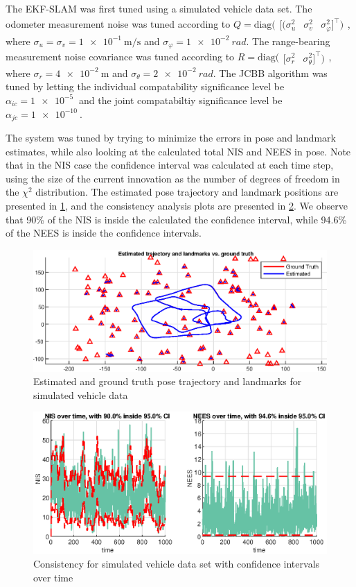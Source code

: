 The EKF-SLAM was first tuned using a simulated vehicle data set. The odometer measurement noise was tuned according to $Q = \text{diag}(\begin{array}{ccc}[(\sigma_u^2 & \sigma_v^2 & \sigma_\varphi^2 ]^{\top})\end{array}$, where $\sigma_u = \sigma_v = \SI{1e-1}{\meter\per\second}$ and $\sigma_\varphi = \SI{1e-2}{rad}$. The range-bearing measurement noise covariance was tuned according to $R = \text{diag}(\begin{array}{cc}[\sigma_r^2 & \sigma_\theta^2 ]^{\top})\end{array}$, where $\sigma_r = \SI{4e-2}{\meter}$ and $\sigma_\theta = \SI{2e-2}{rad}$. The JCBB algorithm was tuned by letting the individual compatability significance level be $\alpha_{ic} = \SI{1e-5}{}$ and the joint compatabiltiy significance level be $\alpha_{jc} = \SI{1e-10}{}$.

The system was tuned by trying to minimize the errors in pose and landmark estimates, while also looking at the calculated total NIS and NEES in pose. Note that in the NIS case the confidence interval was calculated at each time step, using the size of the current innovation as the number of degrees of freedom in the $\chi^2$ distribution. The estimated pose trajectory and landmark positions are presented in \cref{fig:ga_3_sim_trajectory}, and the consistency analysis plots are presented in \cref{fig:ga_3_sim_NIS}. We observe that 90\% of the NIS is inside the calculated the confidence interval, while 94.6\% of the NEES is inside the confidence intervals.

\begin{figure}[!htb]
    \centering
    \includegraphics[width=0.7\linewidth]{figures/ga_3/sim_trajectory.eps}
    \caption{Estimated and ground truth pose trajectory and landmarks for simulated vehicle data}
    \label{fig:ga_3_sim_trajectory}
\end{figure}

\begin{figure}[!htb]
    \centering
    \includegraphics[width=0.9\linewidth]{figures/ga_3/sim_NIS.eps}
    \caption{Consistency for simulated vehicle data set with confidence intervals over time}
    \label{fig:ga_3_sim_NIS}
\end{figure}

